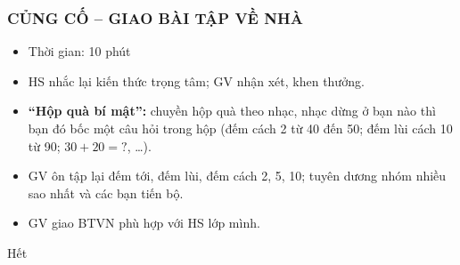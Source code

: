 \documentclass[../main.tex]{subfiles}
\begin{document}
\subsubsection{CỦNG CỐ -- GIAO BÀI TẬP VỀ NHÀ}
\begin{hd}
    \begin{itemize}
        \item Thời gian: 10 phút
        \item HS nhắc lại kiến thức trọng tâm; GV nhận xét, khen thưởng.
    \end{itemize}
\end{hd}
\begin{itemize}
    \item \textbf{“Hộp quà bí mật”:} chuyền hộp quà theo nhạc, nhạc dừng ở bạn nào thì bạn đó bốc một câu hỏi trong hộp (đếm cách 2 từ 40 đến 50; đếm lùi cách 10 từ 90; $30 + 20 = ?$, \dots).
    \item GV ôn tập lại đếm tới, đếm lùi, đếm cách 2, 5, 10; tuyên dương nhóm nhiều sao nhất và các bạn tiến bộ.
    \item GV giao BTVN phù hợp với HS lớp mình.
\end{itemize}

\begin{center}
       \faGg\faGg\quad Hết \quad\faGg\faGg
\end{center}
\end{document}
